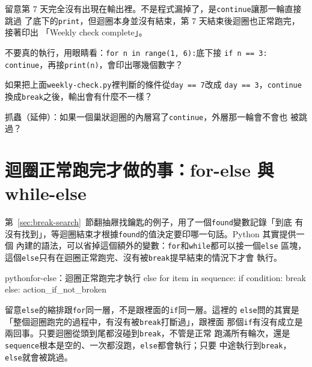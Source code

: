 
留意第 7 天完全沒有出現在輸出裡。不是程式漏掉了，是\texttt{continue}讓那一輪直接跳過
了底下的\texttt{print}，但迴圈本身並沒有結束，第 7 天結束後迴圈也正常跑完，接著印出
「Weekly check complete」。

\begin{drills}[label=drills:continue]
\item 不要真的執行，用眼睛看：\texttt{for n in range(1, 6):}底下接
\texttt{if n == 3: continue}，再接\texttt{print(n)}，會印出哪幾個數字？
\item 如果把上面\texttt{weekly-check.py}裡判斷的條件從\texttt{day == 7}改成
\texttt{day == 3}，\texttt{continue}換成\texttt{break}之後，輸出會有什麼不一樣？
\item 抓蟲（延伸）：如果一個巢狀迴圈的內層寫了\texttt{continue}，外層那一輪會不會也
被跳過？
\end{drills}

\section{迴圈正常跑完才做的事：for-else 與 while-else}
\label{sec:loop-else}

第~\ref{sec:break-search}~節翻抽屜找鑰匙的例子，用了一個\texttt{found}變數記錄「到底
有沒有找到」，等迴圈結束才根據\texttt{found}的值決定要印哪一句話。Python 其實提供一個
內建的語法，可以省掉這個額外的變數：\texttt{for}和\texttt{while}都可以接一個\texttt{else}
區塊，這個\texttt{else}只有在迴圈正常跑完、沒有被\texttt{break}提早結束的情況下才會
執行。

\begin{code}{python}{for-else：迴圈正常跑完才執行 else}
for item in sequence:
    if condition:
        break
else:
    action_if_not_broken
\end{code}

留意\texttt{else}的縮排跟\texttt{for}同一層，不是跟裡面的\texttt{if}同一層。這裡的
\texttt{else}問的其實是「整個迴圈跑完的過程中，有沒有被\texttt{break}打斷過」，跟裡面
那個\texttt{if}有沒有成立是兩回事。只要迴圈從頭到尾都沒碰到\texttt{break}，不管是正常
跑滿所有輪次，還是\texttt{sequence}根本是空的、一次都沒跑，\texttt{else}都會執行；只要
中途執行到\texttt{break}，\texttt{else}就會被跳過。

